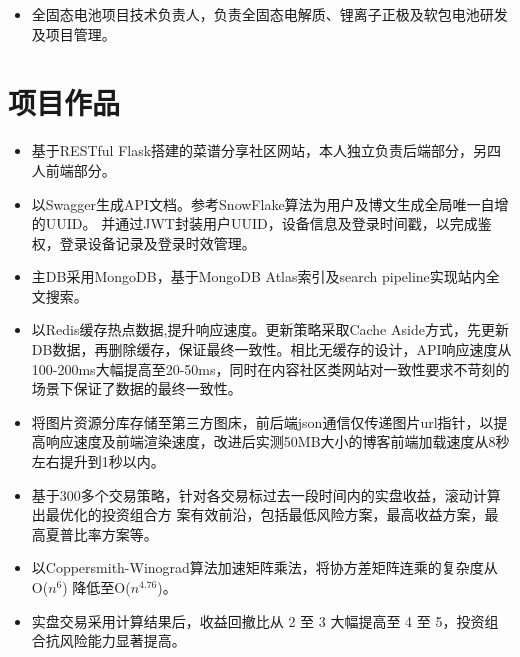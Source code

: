 \documentclass{resume}
\begin{document}
\begin{itemize}
  \item 全固态电池项目技术负责人，负责全固态电解质、锂离子正极及软包电池研发及项目管理。
\end{itemize}


\section{项目作品}

\begin{itemize}
  \item 基于RESTful Flask搭建的菜谱分享社区网站，本人独立负责后端部分，另四人前端部分。
  \item 以Swagger生成API文档。参考SnowFlake算法为用户及博文生成全局唯一自增的UUID。
  并通过JWT封装用户UUID，设备信息及登录时间戳，以完成鉴权，登录设备记录及登录时效管理。
  \item 主DB采用MongoDB，基于MongoDB Atlas索引及search pipeline实现站内全文搜索。
  \item 以Redis缓存热点数据,提升响应速度。更新策略采取Cache Aside方式，先更新DB数据，再删除缓存，保证最终一致性。相比无缓存的设计，API响应速度从100-200ms大幅提高至20-50ms，同时在内容社区类网站对一致性要求不苛刻的场景下保证了数据的最终一致性。
  \item 将图片资源分库存储至第三方图床，前后端json通信仅传递图片url指针，以提高响应速度及前端渲染速度，改进后实测50MB大小的博客前端加载速度从8秒左右提升到1秒以内。

\end{itemize}

\begin{itemize}
  \item 基于300多个交易策略，针对各交易标过去一段时间内的实盘收益，滚动计算出最优化的投资组合方
  案有效前沿，包括最低风险方案，最高收益方案，最高夏普比率方案等。
  \item 以Coppersmith-Winograd算法加速矩阵乘法，将协方差矩阵连乘的复杂度从O($n^6$) 降低至O($n^{4.76}$)。
  \item 实盘交易采用计算结果后，收益回撤比从 2 至 3 大幅提高至 4 至 5，投资组合抗风险能力显著提高。
\end{itemize}
\end{document}
